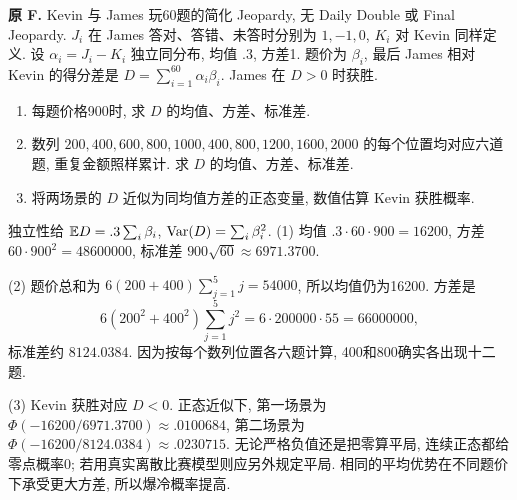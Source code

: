 \begin{exercise}\label{ex:P9.F}
\textbf{原 F.} Kevin 与 James 玩60题的简化 Jeopardy, 无 Daily Double 或 Final Jeopardy. $J_i$ 在 James 答对、答错、未答时分别为 $1,-1,0$, $K_i$ 对 Kevin 同样定义. 设 $\alpha_i=J_i-K_i$ 独立同分布, 均值 $.3$, 方差1. 题价为 $\beta_i$, 最后 James 相对 Kevin 的得分差是 $D=\sum_{i=1}^{60}\alpha_i\beta_i$. James 在 $D>0$ 时获胜.
\begin{enumerate}[label=\arabic*.]
\item\label{part:P9.F.1} 每题价格900时, 求 $D$ 的均值、方差、标准差.
\item\label{part:P9.F.2} 数列 $200,400,600,800,1000,400,800,1200,1600,2000$ 的每个位置均对应六道题, 重复金额照样累计. 求 $D$ 的均值、方差、标准差.
\item\label{part:P9.F.3} 将两场景的 $D$ 近似为同均值方差的正态变量, 数值估算 Kevin 获胜概率.
\end{enumerate}
\end{exercise}
\begin{solution}\label{sol:P9.F}
独立性给 $\mathbb E D=.3\sum_i\beta_i$, $\operatorname{Var}(D)=\sum_i\beta_i^2$. (1) 均值 $.3\cdot60\cdot900=16200$, 方差 $60\cdot900^2=48600000$, 标准差 $900\sqrt{60}\approx6971.3700$.

(2) 题价总和为 $6(200+400)\sum_{j=1}^5j=54000$, 所以均值仍为16200. 方差是
\[
 6(200^2+400^2)\sum_{j=1}^5j^2
 =6\cdot200000\cdot55=66000000,
\]
标准差约 $8124.0384$. 因为按每个数列位置各六题计算, 400和800确实各出现十二题.

(3) Kevin 获胜对应 $D<0$. 正态近似下, 第一场景为 $\Phi(-16200/6971.3700)\approx.0100684$, 第二场景为 $\Phi(-16200/8124.0384)\approx.0230715$. 无论严格负值还是把零算平局, 连续正态都给零点概率0; 若用真实离散比赛模型则应另外规定平局. 相同的平均优势在不同题价下承受更大方差, 所以爆冷概率提高.
\end{solution}


